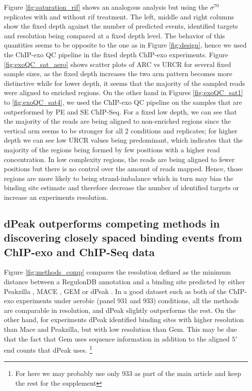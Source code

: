 \documentclass{bmcart}\usepackage[]{graphicx}\usepackage[]{color}
\newcommand{\sig}{\sigma^{70}}
\begin{document}
Figure \ref{fig:saturation_rif} shows an analogous analysis but using
the $\sig$ replicates with and without rif treatment. The left, middle
and right columns show the fixed depth against the number of predicted
events, identified targets and resolution being compared at a fixed
depth level. The behavior of this quantities seems to be opposite to
the one as in Figure \ref{fig:design}, hence we used the ChIP-exo QC
pipeline in the fixed depth ChIP-exo experiments. Figure
\ref{fig:exoQC_sat_aero} shows scatter plots of ARC vs URCR for
several fixed sample sizes, as the fixed depth increases the two arm
pattern becomes more distinctive while for lower depth, it seems that
the majority of the sampled reads were aligned to enriched regions. On
the other hand in Figures \ref{fig:exoQC_sat1} to
\ref{fig:exoQC_sat4}, we used the ChIP-exo QC pipeline on the samples
that are outperformed by PE and SE ChIP-Seq. For a fixed low depth, we
can see that the majority of the reads are being aligned to
non-enriched regions since the vertical arm seems to be stronger for
all 2 conditions and replicates; for higher depth we can see low URCR
values being predominant, which indicates that the majority of the
regions being formed by few positions with a higher read
concentration. In low complexity regions, the reads are being aligned
to fewer positions but there is no control over the amount of reads
mapped. Hence, those regions are more likely to being strand-imbalance
which in turn may bias the binding site estimate and therefore
decrease the number of identified targets or increase an experiments
resolution.


\subsection{dPeak outperforms competing methods in discovering closely
  spaced binding events from ChIP-exo and ChIP-Seq data}

Figure \ref{fig:methods_comp} compares the resolution defined as the
minimum distance between a RegulonDB annotation and a binding site
predicted by either Peakzilla \cite{peakzilla}, MACE \cite{mace}, GEM
\cite{gem} or dPeak \cite{dpeak}. In a good dataset such as both of
the ChIP-exo experiments under aerobic (panel 931 and 933) conditions,
all the methods are comparable in resolution, and dPeak slightly
outperforms the rest. On the other hand, for experiments dPeak
identified binding sites with higher resolution than Mace and
Peakzilla, but with low resolution than Gem. This may be due that the
fact that Gem uses sequence information in addition to the aligned
$5\prime$ end counts that dPeak uses. 
 \footnote{For here we may
  probably use only 933 as part of the main article and keep the rest
  for the supplement}
\end{document}
